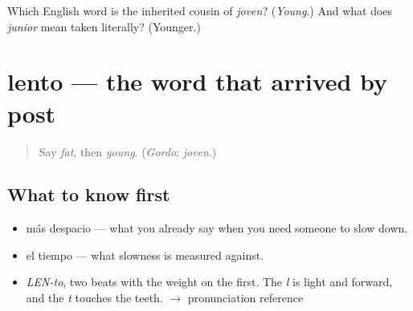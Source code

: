 \begin{tcolorbox}[breakable,colback=teal!4,colframe=teal!35!black,title={Before you move on}]
Which English word is the inherited cousin of \emph{joven}? (\emph{Young}.) And what does \emph{junior} mean taken literally? (Younger.)
\end{tcolorbox}
\section[lento]{lento — the word that arrived by post}

\label{lesson:ES-C371-lento}



\begin{quote}
Say \emph{fat}, then \emph{young}. (\emph{Gordo}; \emph{joven}.)
\end{quote}

\subsection*{What to know first}
\begin{itemize}
\raggedright
  \item más despacio — what you already say when you need someone to slow down.
  \item el tiempo — what slowness is measured against.
\end{itemize}

\begin{sounds}
\begin{itemize}
\raggedright
  \item \emph{LEN-to}, two beats with the weight on the first. The \emph{l} is light and forward, and the \emph{t} touches the teeth. $\to$ pronunciation reference
\end{itemize}
\end{sounds}


